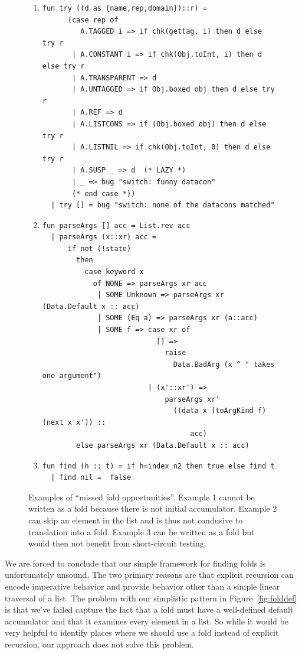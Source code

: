 \documentclass[12pt,abstracton]{scrartcl}
\begin{document}
\begin{figure}
\begin{enumerate}
\item
\begin{verbatim}
fun try ((d as {name,rep,domain})::r) =
      (case rep of
         A.TAGGED i => if chk(gettag, i) then d else try r
       | A.CONSTANT i => if chk(Obj.toInt, i) then d else try r
       | A.TRANSPARENT => d
       | A.UNTAGGED => if Obj.boxed obj then d else try r
       | A.REF => d
       | A.LISTCONS => if (Obj.boxed obj) then d else try r
       | A.LISTNIL => if chk(Obj.toInt, 0) then d else try r
       | A.SUSP _ => d  (* LAZY *)
       | _ => bug "switch: funny datacon"
       (* end case *))
  | try [] = bug "switch: none of the datacons matched"
\end{verbatim}
\item
\begin{verbatim}
fun parseArgs [] acc = List.rev acc
  | parseArgs (x::xr) acc =
      if not (!state)
        then
          case keyword x
            of NONE => parseArgs xr acc
             | SOME Unknown => parseArgs xr (Data.Default x :: acc)
             | SOME (Eq a) => parseArgs xr (a::acc)
             | SOME f => case xr of
                           [] =>
                             raise
                               Data.BadArg (x ^ " takes one argument")
                         | (x'::xr') =>
                             parseArgs xr'
                               ((data x (toArgKind f) (next x x')) ::
                                   acc)
        else parseArgs xr (Data.Default x :: acc)
\end{verbatim}
\item
\begin{verbatim}
fun find (h :: t) = if h=index_n2 then true else find t
  | find nil =  false
\end{verbatim}
\end{enumerate}
\caption{Examples of ``missed fold opportunities''. Example 1 cannot be written as a fold
because there is not initial accumulator.
Example 2 can skip an element in the list
and is thus not condusive to translation into a fold. Example 3
can be written as a fold but would then not benefit from short-circuit testing.}
\label{fig:fold}
\end{figure}

We are forced to conclude that our simple framework for finding folds
is unfortunately unsound. The two primary reasons are that explicit recursion
can encode imperative behavior and provide behavior other than a simple
linear traversal of a list.
The problem with our simplistic pattern in Figure~\ref{fig:folddef}
is that we've failed capture the fact that a fold must have a well-defined
default accumulator and that it examines every element in a list.
So while it would be very helpful to identify places where we should
use a fold instead of explicit recursion, our approach does
not solve this problem.
\end{document}
